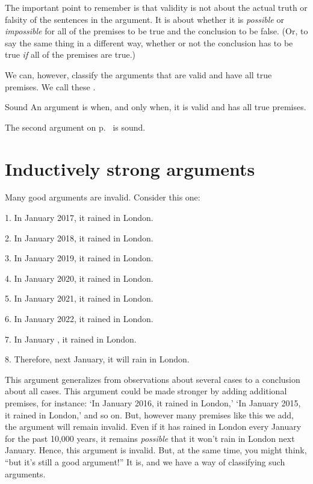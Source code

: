 The important point to remember is that validity is not about the actual truth or falsity of the sentences in the argument. It is about whether it is \emph{possible} or \emph{impossible} for all of the premises to be true and the conclusion to be false. (Or, to say the same thing in a different way, whether or not the conclusion has to be true \textit{if} all of the premises are true.)

We can, however, classify the arguments that are valid and have all true premises. We call these \label{def-sound-arg}. 

\begin{factboxy}{Sound}
An argument is  when, and only when, it is valid and has all true premises.
\end{factboxy}

The second argument on p.~\pageref{valid-bananas} is sound.


\section{Inductively strong arguments}
Many good arguments are invalid. Consider this one:
	\begin{earg}
		\item[1.] In January 2017, it rained in London.
		\item[2.] In January 2018, it rained in London.
		\item[3.] In January 2019, it rained in London.
		\item[4.] In January 2020, it rained in London.
		\item[5.] In January 2021, it rained in London.
		\item[6.] In January 2022, it rained in London.
		\item[7.] In January \the\year{}, it rained in London.
	\item[8.] Therefore, next January, it will rain in London.
\end{earg}
This argument generalizes from observations about several cases to a conclusion about all cases. This argument could be made stronger by adding additional premises, for instance: `In January 2016, it rained in London,' `In January 2015, it rained in London,' and so on. But, however many premises like this we add, the argument will remain invalid. Even if it has rained in London every January for the past 10,000 years, it remains \emph{possible} that it won't rain in London next January. Hence, this argument is invalid. But, at the same time, you might think, ``but it's still a good argument!'' It is, and we have a way of classifying such arguments.

